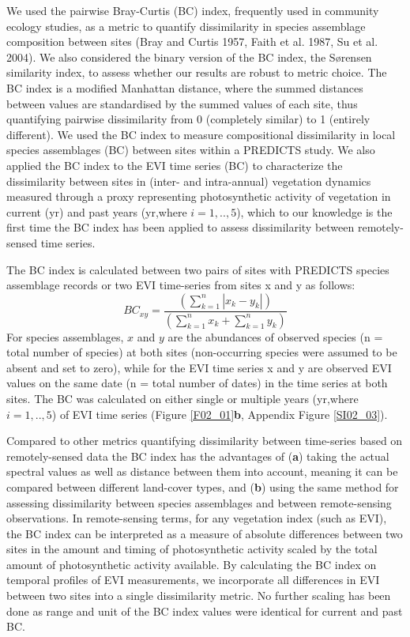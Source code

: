 We used the pairwise Bray-Curtis (BC) index, frequently used in community ecology studies, as a metric to quantify dissimilarity in species assemblage composition between sites (Bray and Curtis 1957, Faith et al. 1987, Su et al. 2004). We also considered the binary version of the BC index, the S\o rensen similarity index, to assess whether our results are robust to metric choice. The BC index is a modified Manhattan distance, where the summed distances between values are standardised by the summed values of each site, thus quantifying pairwise dissimilarity from 0 (completely similar) to 1 (entirely different). We used the BC index to measure compositional dissimilarity in local species assemblages (BC) between sites within a PREDICTS study. We also applied the BC index to the EVI time series (BC) to characterize the dissimilarity between sites in (inter- and intra-annual) vegetation dynamics measured through a proxy representing photosynthetic activity of vegetation in current (yr) and past years (yr,where $i = 1,..,5$), which to our knowledge is the first time the BC index has been applied to assess dissimilarity between remotely-sensed time series.

The BC index is calculated between two pairs of sites with PREDICTS species assemblage records or two EVI time-series from sites x and y as follows: 
\begin{equation*}
    BC_{xy} = \frac{( \sum_{k=1}^{n} |x_k - y_k  | )}{ (\sum_{k=1}^{n} x_k + \sum_{k=1}^{n} y_k )}
\end{equation*}
For species assemblages, $x$ and $y$ are the abundances of observed species (n = total number of species) at both sites (non-occurring species were assumed to be absent and set to zero), while for the EVI time series x and y are observed EVI values on the same date (n = total number of dates) in the time series at both sites. The BC was calculated on either single or multiple years (yr,where $i = 1,..,5$) of EVI time series (Figure \ref{F02_01}\textbf{b}, Appendix Figure \ref{SI02_03}).

Compared to other metrics quantifying dissimilarity between time-series based on remotely-sensed data \citep{Lhermitte2011} the BC index has the advantages of (\textbf{a}) taking the actual spectral values as well as distance between them into account, meaning it can be compared between different land-cover types, and (\textbf{b}) using the same method for assessing dissimilarity between species assemblages and between remote-sensing observations. In remote-sensing terms, for any vegetation index (such as EVI), the BC index can be interpreted as a measure of absolute differences between two sites in the amount and timing of photosynthetic activity scaled by the total amount of photosynthetic activity available. By calculating the BC index on temporal profiles of EVI measurements, we incorporate all differences in EVI between two sites into a single dissimilarity metric. No further scaling has been done as range and unit of the BC index values were identical for current and past BC.


